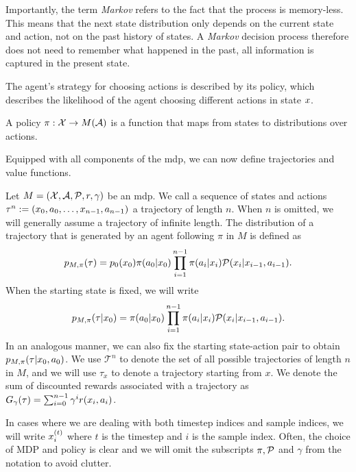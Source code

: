 Importantly, the term \emph{Markov} refers to the fact that the process is memory-less.
This means that the next state distribution only depends on the current state and action, not on the past history of states.
A \emph{Markov} decision process therefore does not need to remember what happened in the past, all information is captured in the present state.

The agent's strategy for choosing actions is described by its policy, which describes the likelihood of the agent choosing different actions in state $\state$.

\begin{definition}[Policy]
    A policy $\pi: \states \rightarrow M(\actions)$ is a function that maps from states to distributions over actions.
\end{definition}

Equipped with all components of the \ac{mdp}, we can now define trajectories and value functions.

\begin{definition}[Trajectories]
    Let $M = (\states,\actions,\mathcal{P},r,\gamma)$ be an \ac{mdp}.
    We call a sequence of states and actions $\tau^n := (\state_0,a_0,\dots,\state_{n-1},a_{n-1})$ a trajectory of length $n$.
    When $n$ is omitted, we will generally assume a trajectory of infinite length.
    The distribution of a trajectory that is generated by an agent following $\pi$ in $M$ is defined as $$p_{M, \pi}(\tau) = p_0(\state_0) \pi(a_0|\state_0) \prod_{i=1}^{n-1} \pi(a_i|\state_i) \mathcal{P}(\state_i|\state_{i-1},a_{i-1}).$$
    When the starting state is fixed, we will write $$p_{M,\pi}(\tau|\state_0) = \pi(a_0|\state_0) \prod_{i=1}^{n-1} \pi(a_i|\state_i) \mathcal{P}(\state_i|\state_{i-1},a_{i-1}).$$
    In an analogous manner, we can also fix the starting state-action pair to obtain $p_{M,\pi}(\tau|\state_0,a_0)$.
    We use $\mathcal{T}^n$ to denote the set of all possible trajectories of length $n$ in $M$, and we will use $\tau_x$ to denote a trajectory starting from $x$.
    We denote the sum of discounted rewards associated with a trajectory as $G_\gamma(\tau) = \sum_{i=0}^{n-1} \gamma^i r(\state_i,a_i)$.
\end{definition}

In cases where we are dealing with both timestep indices and sample indices, we will write $\state^{(t)}_i$ where $t$ is the timestep and $i$ is the sample index.
Often, the choice of MDP and policy is clear and we will omit the subscripts $\pi,\P$ and $\gamma$ from the notation to avoid clutter.

